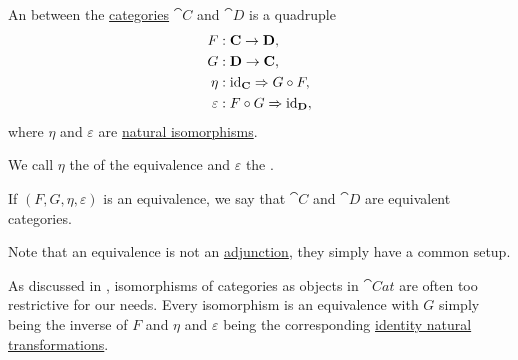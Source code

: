 \begin{definition}\label{def:category_equivalence}
  An  between the \hyperref[def:category]{categories} \( \cat{C} \) and \( \cat{D} \) is a quadruple
  \begin{equation}\label{eq:def:category_equivalence/signature}
    \begin{aligned}
                F &: \cat{C} \to \cat{D}, \\
                G &: \cat{D} \to \cat{C}, \\
             \eta &: \id_{\cat{C}} \Rightarrow G \bincirc F, \\
      \varepsilon &: F \bincirc G \Rightarrow \id_{\cat{D}},
    \end{aligned}
  \end{equation}
  where \( \eta \) and \( \varepsilon \) are \hyperref[thm:natural_isomorphism]{natural isomorphisms}.

  We call \( \eta \) the  of the equivalence and \( \varepsilon \) the .

  If \( (F, G, \eta, \varepsilon) \) is an equivalence, we say that \( \cat{C} \) and \( \cat{D} \) are equivalent categories.

  Note that an equivalence is not an \hyperref[def:category_adjunction]{adjunction}, they simply have a common setup.
\end{definition}

\begin{remark}\label{rem:category_equivalence}
  As discussed in , isomorphisms of categories as objects in \( \cat{Cat} \) are often too restrictive for our needs. Every isomorphism is an equivalence with \( G \) simply being the inverse of \( F \) and \( \eta \) and \( \varepsilon \) being the corresponding \hyperref[eq:def:functor_category/identity]{identity natural transformations}.
\end{remark}

